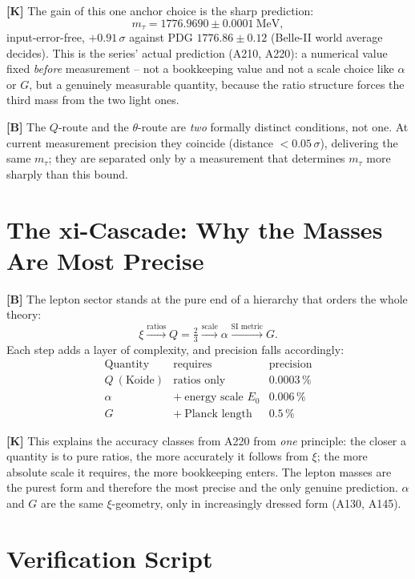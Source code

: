 \textbf{[K]} The gain of this one anchor choice is the sharp prediction:
\[
  m_\tau = 1776{.}9690 \pm 0{.}0001\ \text{MeV},
\]
input-error-free, $+0{.}91\,\sigma$ against PDG $1776{.}86\pm0{.}12$
(Belle-II world average decides). This is the series' actual prediction
(A210, A220): a numerical value fixed \emph{before} measurement -- not a
bookkeeping value and not a scale choice like $\alpha$ or $G$, but a
genuinely measurable quantity, because the ratio structure forces the third mass
from the two light ones.

\textbf{[B]} The $Q$-route and the $\theta$-route are \emph{two} formally distinct
conditions, not one. At current measurement precision they coincide
(distance $<0{.}05\,\sigma$), delivering the same $m_\tau$; they are separated
only by a measurement that determines $m_\tau$ more sharply than this bound.

\section{The xi-Cascade: Why the Masses Are Most Precise}

\textbf{[B]} The lepton sector stands at the pure end of a hierarchy that orders
the whole theory:
\[
  \xi \xrightarrow{\text{ratios}} Q=\tfrac23
    \xrightarrow{\text{scale}} \alpha
    \xrightarrow{\text{SI metric}} G.
\]
Each step adds a layer of complexity, and precision falls accordingly:
\[
  \begin{array}{lcc}
    \text{Quantity} & \text{requires} & \text{precision} \\[2pt]
    Q\ (\text{Koide}) & \text{ratios only} & 0{.}0003\,\% \\
    \alpha & +\ \text{energy scale } E_0 & 0{.}006\,\% \\
    G & +\ \text{Planck length} & 0{.}5\,\%
  \end{array}
\]


\textbf{[K]} This explains the accuracy classes from A220 from \emph{one}
principle: the closer a quantity is to pure ratios, the more accurately it
follows from $\xi$; the more absolute scale it requires, the more bookkeeping
enters. The lepton masses are the purest form and therefore the most precise
and the only genuine prediction. $\alpha$ and $G$ are the same $\xi$-geometry,
only in increasingly dressed form (A130, A145).

\section{Verification Script}

